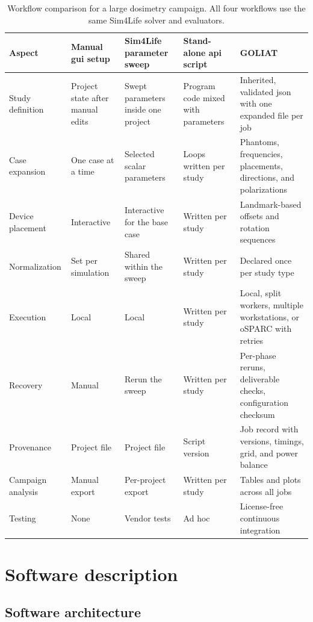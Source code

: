 \documentclass[final,5p,times,twocolumn]{elsarticle}
\begin{document}
\begin{table}[!ht]
\centering
\small
\begin{tabularx}{\textwidth}{@{}>{\raggedright\arraybackslash}p{}>{\raggedright\arraybackslash}X>{\raggedright\arraybackslash}X>{\raggedright\arraybackslash}X>{\raggedright\arraybackslash}X@{}}
\toprule
Aspect & Manual \gls{gui} setup & Sim4Life parameter sweep & Stand-alone \gls{api} script & GOLIAT \\
\midrule
Study definition & Project state after manual edits & Swept parameters inside one project & Program code mixed with parameters & Inherited, validated \gls{json} with one expanded file per job \\
Case expansion & One case at a time & Selected scalar parameters & Loops written per study & Phantoms, frequencies, placements, directions, and polarizations \\
Device placement & Interactive & Interactive for the base case & Written per study & Landmark-based offsets and rotation sequences \\
Normalization & Set per simulation & Shared within the sweep & Written per study & Declared once per study type \\
Execution & Local & Local & Written per study & Local, split workers, multiple workstations, or oSPARC with retries \\
Recovery & Manual & Rerun the sweep & Written per study & Per-phase reruns, deliverable checks, configuration checksum \\
Provenance & Project file & Project file & Script version & Job record with versions, timings, grid, and power balance \\
Campaign analysis & Manual export & Per-project export & Written per study & Tables and plots across all jobs \\
Testing & None & Vendor tests & Ad hoc & License-free continuous integration \\
\bottomrule
\end{tabularx}
\caption{Workflow comparison for a large dosimetry campaign. All four workflows use the same Sim4Life solver and evaluators.}
\label{tab:comparison}
\end{table}

\section{Software description}

\subsection{Software architecture}
\end{document}

